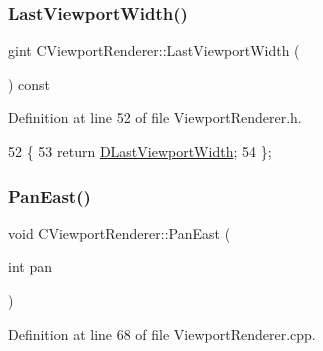 \subsubsection{\texorpdfstring{Last\+Viewport\+Width()}{LastViewportWidth()}}
{\footnotesize\ttfamily gint C\+Viewport\+Renderer\+::\+Last\+Viewport\+Width (\begin{DoxyParamCaption}{ }\end{DoxyParamCaption}) const\hspace{0.3cm}{\ttfamily [inline]}}



Definition at line 52 of file Viewport\+Renderer.\+h.


\begin{DoxyCode}
52                                       \{
53             \textcolor{keywordflow}{return} \hyperlink{classCViewportRenderer_aaa21acd1b43badc3c1a3b0bf9b0f86f9}{DLastViewportWidth};
54         \};
\end{DoxyCode}
\hypertarget{classCViewportRenderer_a047d0b83f7744a9d8b184471dae0cd3c}{}\label{classCViewportRenderer_a047d0b83f7744a9d8b184471dae0cd3c} 
\subsubsection{\texorpdfstring{Pan\+East()}{PanEast()}}
{\footnotesize\ttfamily void C\+Viewport\+Renderer\+::\+Pan\+East (\begin{DoxyParamCaption}\item[{int}]{pan }\end{DoxyParamCaption})}



Definition at line 68 of file Viewport\+Renderer.\+cpp.


